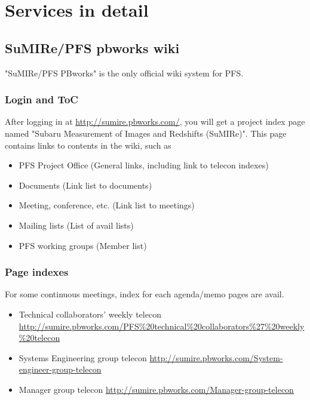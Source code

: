 \documentclass[a4paper,notitlepage]{article}
\begin{document}
\section{Services in detail}

\subsection{SuMIRe/PFS pbworks wiki}

"SuMIRe/PFS PBworks" is the only official wiki system for PFS. 

\subsubsection{Login and ToC}

After logging in at \url{http://sumire.pbworks.com/}, 
you will get a project index page named 
"Subaru Measurement of Images and Redshifts (SuMIRe)". 
This page contains links to contents in the wiki, such as 

\begin{itemize}
  \item PFS Project Office (General links, including link to telecon indexes)
  \item Documents (Link list to documents)
  \item Meeting, conference, etc.  (Link list to meetings)
  \item Mailing lists (List of avail lists)
  \item PFS working groups (Member list)
\end{itemize}

\subsubsection{Page indexes}

For some continuous meetings, index for each agenda/memo pages are avail.

\begin{itemize}
  \item Technical collaborators' weekly telecon \url{http://sumire.pbworks.com/PFS%20technical%20collaborators%27%20weekly%20telecon}
  \item Systems Engineering group telecon \url{http://sumire.pbworks.com/System-engineer-group-telecon}
  \item Manager group telecon \url{http://sumire.pbworks.com/Manager-group-telecon}
\end{itemize}
\end{document}
